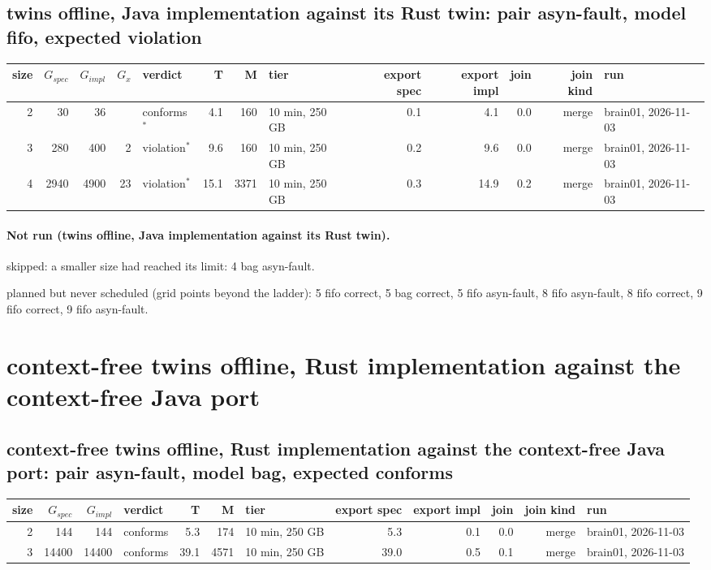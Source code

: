 \documentclass[10pt]{article}
\begin{document}
\subsection*{twins offline, Java implementation against its Rust twin: pair \textsf{asyn-fault}, model fifo, expected violation}
\begin{longtable}{@{}rrrrlrrlrrrrl@{}}
\toprule
size & $G_{\mathit{spec}}$ & $G_{\mathit{impl}}$ & $G_x$ & verdict & T & M & tier & export spec & export impl & join & join kind & run \\
\midrule
\endhead
\color{blue} 2 & 30 & 36 &  & conforms$^{\ast}$ & 4.1 & 160 & 10 min, 250 GB & 0.1 & 4.1 & 0.0 & merge & brain01, 2026-11-03 \\
\color{blue} 3 & 280 & 400 & 2 & violation$^{\ast}$ & 9.6 & 160 & 10 min, 250 GB & 0.2 & 9.6 & 0.0 & merge & brain01, 2026-11-03 \\
\color{blue} 4 & 2940 & 4900 & 23 & violation$^{\ast}$ & 15.1 & 3371 & 10 min, 250 GB & 0.3 & 14.9 & 0.2 & merge & brain01, 2026-11-03 \\
\bottomrule
\end{longtable}
\paragraph{Not run (twins offline, Java implementation against its Rust twin).}
skipped: a smaller size had reached its limit: 4 bag asyn-fault.\par
planned but never scheduled (grid points beyond the ladder): 5 fifo correct, 5 bag correct, 5 fifo asyn-fault, 8 fifo asyn-fault, 8 fifo correct, 9 fifo correct, 9 fifo asyn-fault.\par
\section*{context-free twins offline, Rust implementation against the context-free Java port}
\subsection*{context-free twins offline, Rust implementation against the context-free Java port: pair \textsf{asyn-fault}, model bag, expected conforms}
\begin{longtable}{@{}rrrlrrlrrrrl@{}}
\toprule
size & $G_{\mathit{spec}}$ & $G_{\mathit{impl}}$ & verdict & T & M & tier & export spec & export impl & join & join kind & run \\
\midrule
\endhead
\color{blue} 2 & 144 & 144 & conforms & 5.3 & 174 & 10 min, 250 GB & 5.3 & 0.1 & 0.0 & merge & brain01, 2026-11-03 \\
\color{blue} 3 & 14400 & 14400 & conforms & 39.1 & 4571 & 10 min, 250 GB & 39.0 & 0.5 & 0.1 & merge & brain01, 2026-11-03 \\
\bottomrule
\end{longtable}
\end{document}
